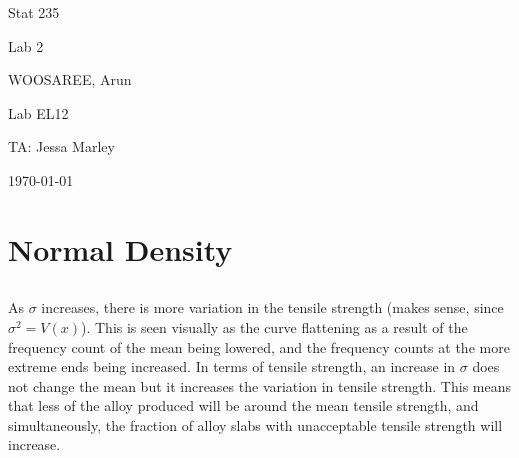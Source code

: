 \documentclass[letterpaper]{article}
\begin{document}
\begin{titlepage}
 \begin{center}
  \vspace*{1cm}
  \Huge
  Stat 235
  \vspace{1cm}
  
  Lab 2
  \vspace{1cm}
  
  WOOSAREE, Arun
  \vspace{1cm}
  
  \Huge
  Lab EL12
  \vspace{1cm}
  
  TA: Jessa Marley
  \vspace{1cm}
  
  \today
  \vfill
 \end{center}
\end{titlepage}

\section{Normal Density}

\subsection{}%



As $\sigma$ increases, there is more variation in the tensile strength (makes
sense, since $\sigma^2=V(x)$). This is seen visually as the curve flattening as
a result of the frequency count of the mean being lowered, and the frequency
counts at the more extreme ends being increased. In terms of tensile strength,
an increase in $\sigma$ does not change the mean but it increases the variation
in tensile strength. This means that less of the alloy produced will be around
the mean tensile strength, and simultaneously, the fraction of alloy slabs with
unacceptable tensile strength will increase.

\subsection{}%
\end{document}
